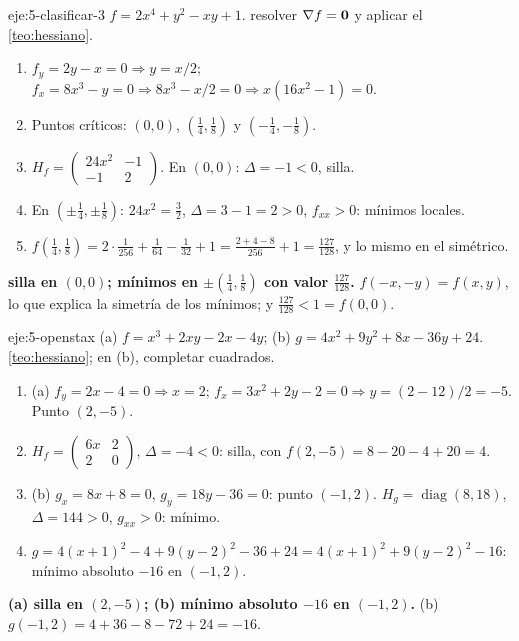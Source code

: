 \begin{solucion}{eje:5-clasificar-3}
\datos $f=2x^4+y^2-xy+1$.
\planteamiento resolver $\nabla f=\mathbf{0}$ y aplicar el \cref{teo:hessiano}.
\pasos
\begin{enumerate}[label=\arabic*.]
  \item $f_y=2y-x=0\Rightarrow y=x/2$; $f_x=8x^3-y=0\Rightarrow8x^3-x/2=0\Rightarrow x(16x^2-1)=0$.
  \item Puntos críticos: $(0,0)$, $(\frac14,\frac18)$ y $(-\frac14,-\frac18)$.
  \item $H_f=\begin{pmatrix}24x^2&-1\\-1&2\end{pmatrix}$. En $(0,0)$: $\Delta=-1<0$, silla.
  \item En $(\pm\frac14,\pm\frac18)$: $24x^2=\frac32$, $\Delta=3-1=2>0$, $f_{xx}>0$: mínimos locales.
  \item $f(\frac14,\frac18)=2\cdot\frac{1}{256}+\frac1{64}-\frac1{32}+1=\frac{2+4-8}{256}+1=\frac{127}{128}$, y lo mismo en el simétrico.
\end{enumerate}
\resultado \textbf{silla en $(0,0)$; mínimos en $\pm(\frac14,\frac18)$ con valor $\frac{127}{128}$.}
\comprobacion $f(-x,-y)=f(x,y)$, lo que explica la simetría de los mínimos; y $\frac{127}{128}<1=f(0,0)$.
\end{solucion}

\begin{solucion}{eje:5-openstax}
\datos (a) $f=x^3+2xy-2x-4y$; (b) $g=4x^2+9y^2+8x-36y+24$.
\planteamiento \cref{teo:hessiano}; en (b), completar cuadrados.
\pasos
\begin{enumerate}[label=\arabic*.]
  \item (a) $f_y=2x-4=0\Rightarrow x=2$; $f_x=3x^2+2y-2=0\Rightarrow y=(2-12)/2=-5$. Punto $(2,-5)$.
  \item $H_f=\begin{pmatrix}6x&2\\2&0\end{pmatrix}$, $\Delta=-4<0$: silla, con $f(2,-5)=8-20-4+20=4$.
  \item (b) $g_x=8x+8=0$, $g_y=18y-36=0$: punto $(-1,2)$. $H_g=\operatorname{diag}(8,18)$, $\Delta=144>0$, $g_{xx}>0$: mínimo.
  \item $g=4(x+1)^2-4+9(y-2)^2-36+24=4(x+1)^2+9(y-2)^2-16$: mínimo absoluto $-16$ en $(-1,2)$.
\end{enumerate}
\resultado \textbf{(a) silla en $(2,-5)$; (b) mínimo absoluto $-16$ en $(-1,2)$.}
\comprobacion (b) $g(-1,2)=4+36-8-72+24=-16$.
\end{solucion}

